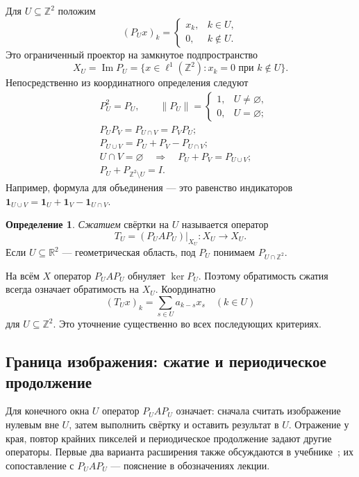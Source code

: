 \documentclass[12pt,a4paper]{article}
\theoremstyle{definition}
\newtheorem{definition}{Определение}
\theoremstyle{remark}
\newcommand{\RR}{\mathbb{R}}
\newcommand{\ZZ}{\mathbb{Z}}
\newcommand{\norm}[1]{\left\lVert #1\right\rVert}
\begin{document}
Для $U\subseteq\ZZ^2$ положим
\[
  (P_Ux)_k=\begin{cases}x_k,&k\in U,\\0,&k\notin U.\end{cases}
\]
Это ограниченный проектор на замкнутое подпространство
\[
  X_U=\operatorname{Im}P_U
  =\{x\in\ell^1(\ZZ^2):x_k=0\text{ при }k\notin U\}.
\]
Непосредственно из координатного определения следуют
\begin{align*}
  &P_U^2=P_U,\qquad
   \norm{P_U}=\begin{cases}1,&U\ne\varnothing,\\0,&U=\varnothing;\end{cases}\\
  &P_UP_V=P_{U\cap V}=P_VP_U;\\
  &P_{U\cup V}=P_U+P_V-P_{U\cap V};\\
  &U\cap V=\varnothing\quad\Longrightarrow\quad
    P_U+P_V=P_{U\cup V};\\
  &P_U+P_{\ZZ^2\setminus U}=I.
\end{align*}
Например, формула для объединения --- это равенство индикаторов
$\mathbf1_{U\cup V}=\mathbf1_U+\mathbf1_V-\mathbf1_{U\cap V}$.

\begin{definition}
\emph{Сжатием} свёртки на $U$ называется оператор
\[
  T_U=(P_UAP_U)|_{X_U}:X_U\longrightarrow X_U.
\]
Если $U\subseteq\RR^2$ --- геометрическая область, под $P_U$
понимаем $P_{U\cap\ZZ^2}$.
\end{definition}

На всём $X$ оператор $P_UAP_U$ обнуляет $\ker P_U$.
Поэтому обратимость сжатия всегда означает обратимость на $X_U$.
Координатно
\[
  (T_Ux)_k=\sum_{s\in U}a_{k-s}x_s\quad(k\in U)
\]
для $U\subseteq\ZZ^2$. Это уточнение существенно во всех
последующих критериях.

\subsection*{Граница изображения: сжатие и периодическое продолжение}

Для конечного окна $U$ оператор $P_UAP_U$ означает:
сначала считать изображение нулевым вне $U$, затем выполнить
свёртку и оставить результат в $U$. Отражение у края, повтор
крайних пикселей и периодическое продолжение задают другие
операторы. Первые два варианта расширения также обсуждаются
в учебнике~\cite[\S\,3.4.2, с.~190]{GW2012}; их сопоставление
с $P_UAP_U$ --- пояснение в обозначениях лекции.
\end{document}
